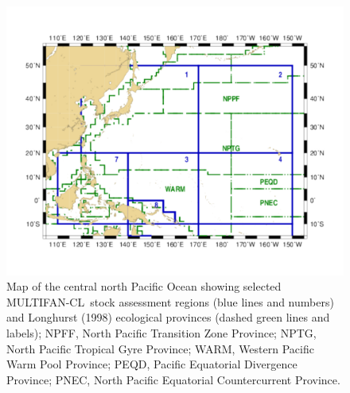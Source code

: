 \documentclass[12pt,letterpaper]{article}
\newcommand\MFCL{MULTIFAN-CL}
\begin{document}
\begin{figure}
\begin{center}
\includegraphics[width=1.10\textwidth]{./paczones.pdf}
\caption{Map of the central north Pacific Ocean showing selected \MFCL\
stock assessment regions (blue lines and numbers) and 
Longhurst (1998) ecological provinces (dashed green lines and labels);
NPFF, North Pacific Transition Zone Province;
NPTG, North Pacific Tropical Gyre Province;
WARM, Western Pacific Warm Pool Province;
PEQD, Pacific Equatorial Divergence Province;
PNEC, North Pacific Equatorial Countercurrent Province.
\label{fig:paczones}}
\end{center}
\end{figure}
\end{document}

